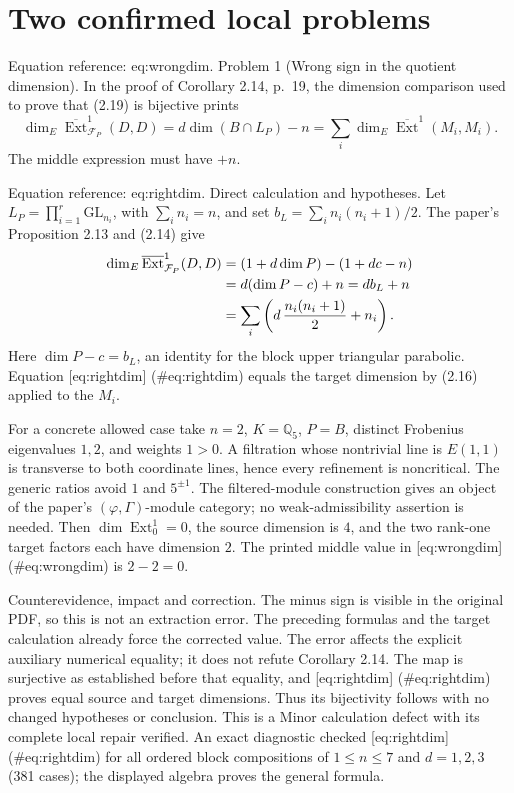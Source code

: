 \documentclass[10pt]{article}
\begin{document}
\section*{Two confirmed local problems}
Equation reference: eq:wrongdim. Problem 1 (Wrong sign in the quotient dimension).  In the proof of Corollary 2.14, p. 19, the dimension comparison used to prove that (2.19) is bijective prints \[
 \dim_E\overline{\operatorname{Ext}}^1_{\mathcal F_P}(D,D)
   =d\dim(B\cap L_P)-n
   =\sum_i\dim_E\overline{\operatorname{Ext}}^1(M_i,M_i).\] The middle expression must have \(+n\).\par
Equation reference: eq:rightdim. Direct calculation and hypotheses. Let \(L_P=\prod_{i=1}^r\mathrm{GL}_{n_i}\), with \(\sum_i n_i=n\), and set \(b_L=\sum_i n_i(n_i+1)/2\). The paper’s Proposition 2.13 and (2.14) give \[\begin{aligned}
 \dim_E\overline{\operatorname{Ext}}^1_{\mathcal F_P}(D,D)
 &= (1+d\dim P)-(1+dc-n)\notag\\
 &=d(\dim P-c)+n
 =db_L+n\notag\\
 &=\sum_i\left(d\,\frac{n_i(n_i+1)}2+n_i\right).
 \end{aligned}\] Here \(\dim P-c=b_L\), an identity for the block upper triangular parabolic. Equation [eq:rightdim] (\#eq:rightdim) equals the target dimension by (2.16) applied to the \(M_i\).\par
For a concrete allowed case take \(n=2\), \(K=\mathbb Q_5\), \(P=B\), distinct Frobenius eigenvalues \(1,2\), and weights \(1>0\). A filtration whose nontrivial line is \(E(1,1)\) is transverse to both coordinate lines, hence every refinement is noncritical. The generic ratios avoid \(1\) and \(5^{\pm1}\). The filtered-module construction gives an object of the paper’s \((\varphi,\Gamma)\)-module category; no weak-admissibility assertion is needed. Then \(\dim\operatorname{Ext}^1_0=0\), the source dimension is \(4\), and the two rank-one target factors each have dimension \(2\). The printed middle value in [eq:wrongdim] (\#eq:wrongdim) is \(2-2=0\).\par
Counterevidence, impact and correction. The minus sign is visible in the original PDF, so this is not an extraction error. The preceding formulas and the target calculation already force the corrected value. The error affects the explicit auxiliary numerical equality; it does not refute Corollary 2.14. The map is surjective as established before that equality, and [eq:rightdim] (\#eq:rightdim) proves equal source and target dimensions. Thus its bijectivity follows with no changed hypotheses or conclusion. This is a Minor calculation defect with its complete local repair verified. An exact diagnostic checked [eq:rightdim] (\#eq:rightdim) for all ordered block compositions of \(1\le n\le7\) and \(d=1,2,3\) (381 cases); the displayed algebra proves the general formula.\par
\end{document}
